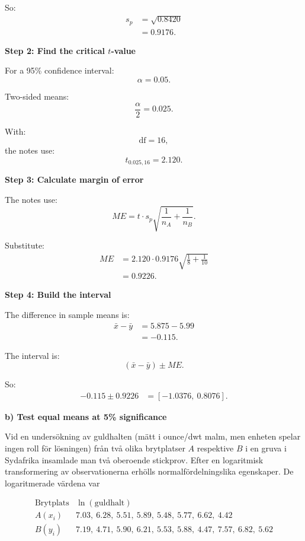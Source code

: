 \documentclass[10pt]{article}
\begin{document}
So:
\begin{align*}
s_p
&=
\sqrt{0.8420}
\\[2mm]
&=
0.9176.
\end{align*}

\textbf{Step 2: Find the critical \(t\)-value}

For a 95\% confidence interval:
\[
\alpha=0.05.
\]

Two-sided means:
\[
\frac{\alpha}{2}=0.025.
\]

With:
\[
\text{df}=16,
\]
the notes use:
\[
t_{0.025,16}=2.120.
\]

\textbf{Step 3: Calculate margin of error}

The notes use:
\[
ME
=
t\cdot s_p
\sqrt{
\frac{1}{n_A}
+
\frac{1}{n_B}
}.
\]

Substitute:
\begin{align*}
ME
&=
2.120\cdot 0.9176
\sqrt{
\frac{1}{8}
+
\frac{1}{10}
}
\\[2mm]
&=
0.9226.
\end{align*}

\textbf{Step 4: Build the interval}

The difference in sample means is:
\begin{align*}
\bar{x}-\bar{y}
&=
5.875-5.99
\\[2mm]
&=
-0.115.
\end{align*}

The interval is:
\[
(\bar{x}-\bar{y})\pm ME.
\]

So:
\begin{align*}
-0.115\pm 0.9226
&=
[-1.0376,\ 0.8076].
\end{align*}

\textbf{b) Test equal means at 5\% significance}

Vid en undersökning av guldhalten (mätt i
ounce/dwt malm, men enheten spelar ingen roll för
lösningen) från två olika brytplatser \(A\)
respektive \(B\) i en gruva i Sydafrika insamlade
man två oberoende stickprov. Efter en logaritmisk
transformering av observationerna erhölls
normalfördelningslika egenskaper. De logaritmerade
värdena var

\[
\begin{array}{c|c}
\text{Brytplats} & \ln(\text{guldhalt})\\
\hline
A(x_i) &
7.03,\ 6.28,\ 5.51,\ 5.89,\ 5.48,\ 5.77,\ 6.62,\ 4.42\\
B(y_i) &
7.19,\ 4.71,\ 5.90,\ 6.21,\ 5.53,\ 5.88,\ 4.47,\ 7.57,\ 6.82,\ 5.62
\end{array}
\]
\end{document}
